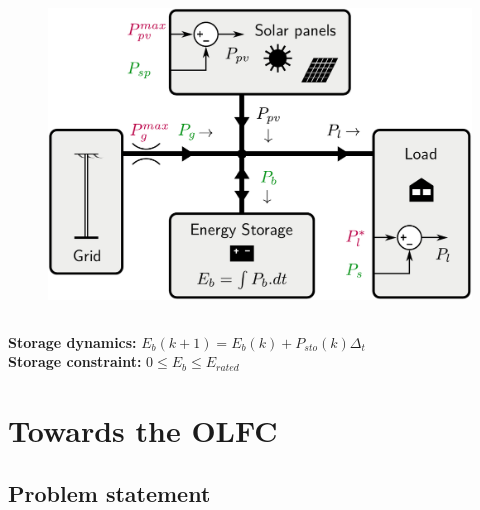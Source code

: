 \documentclass{beamer}
\begin{document}
\begin{frame}
\begin{columns}
    \begin{column}{0.55\textwidth}
        \begin{figure}[!ht]
            \begin{center}
                \includegraphics[width=1\columnwidth]{Figures/solar_home_compact.pdf}
            \end{center}
        \end{figure}
    \end{column}
\end{columns}

\vspace{5px}  
\pause \textbf{Storage dynamics:} $ E_{b}(k+1) = E_{b}(k) + P_{sto}(k)\Delta_t$ \\\vspace{5px}
\textbf{Storage constraint: }$0 \leq E_{b} \leq E_{rated}$ \\ \vspace{5px}

\end{frame}
\endgroup


\begingroup



\begingroup
\section{Towards the OLFC}
\subsection{Problem statement}
\fontsize{10}{11}\selectfont
\end{document}
